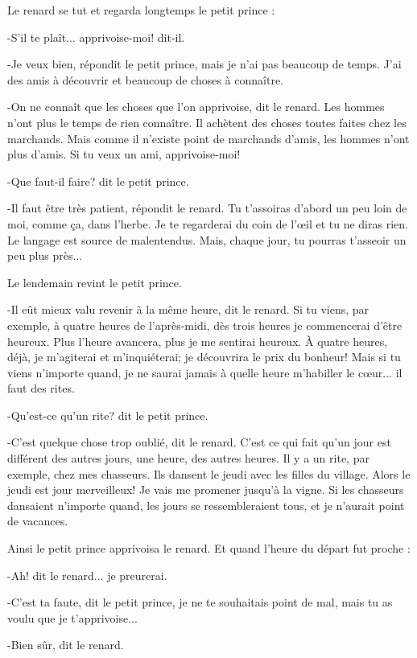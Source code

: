 \documentclass{report}
\begin{document}
Le renard se tut et regarda longtemps le petit prince :

-S'il te plaît... apprivoise-moi! dit-il.

-Je veux bien, répondit le petit prince, mais je n'ai pas beaucoup de temps. J'ai des amis à découvrir et beaucoup de choses à connaître.

-On ne connaît que les choses que l'on apprivoise, dit le renard. Les hommes n'ont plus le temps de rien connaître. Il achètent des choses toutes faites chez les marchands. Mais comme il n'existe point de marchands d'amis, les hommes n'ont plus d'amis. Si tu veux un ami, apprivoise-moi!

-Que faut-il faire? dit le petit prince.

-Il faut être très patient, répondit le renard. Tu t'assoiras d'abord un peu loin de moi, comme ça, dans l'herbe. Je te regarderai du coin de l'œil et tu ne diras rien. Le langage est source de malentendus. Mais, chaque jour, tu pourras t'asseoir un peu plus près...

Le lendemain revint le petit prince.

-Il eût mieux valu revenir à la même heure, dit le renard. Si tu viens, par exemple, à quatre heures de l'après-midi, dès trois heures je commencerai d'être heureux. Plus l'heure avancera, plus je me sentirai heureux. À quatre heures, déjà, je m'agiterai et m'inquiéterai; je découvrira le prix du bonheur! Mais si tu viens n'importe quand, je ne saurai jamais à quelle heure m'habiller le cœur... il faut des rites.

-Qu'est-ce qu'un rite? dit le petit prince.

-C'est quelque chose trop oublié, dit le renard. C'est ce qui fait qu'un jour est différent des autres jours, une heure, des autres heures. Il y a un rite, par exemple, chez mes chasseurs. Ils dansent le jeudi avec les filles du village. Alors le jeudi est jour merveilleux! Je vais me promener jusqu'à la vigne. Si les chasseurs dansaient n'importe quand, les jours se ressembleraient tous, et je n'aurait point de vacances.


Ainsi le petit prince apprivoisa le renard. Et quand l'heure du départ fut proche :

-Ah! dit le renard... je preurerai.

-C'est ta faute, dit le petit prince, je ne te souhaitais point de mal, mais tu as voulu que je t'apprivoise...

-Bien sûr, dit le renard.
\end{document}
